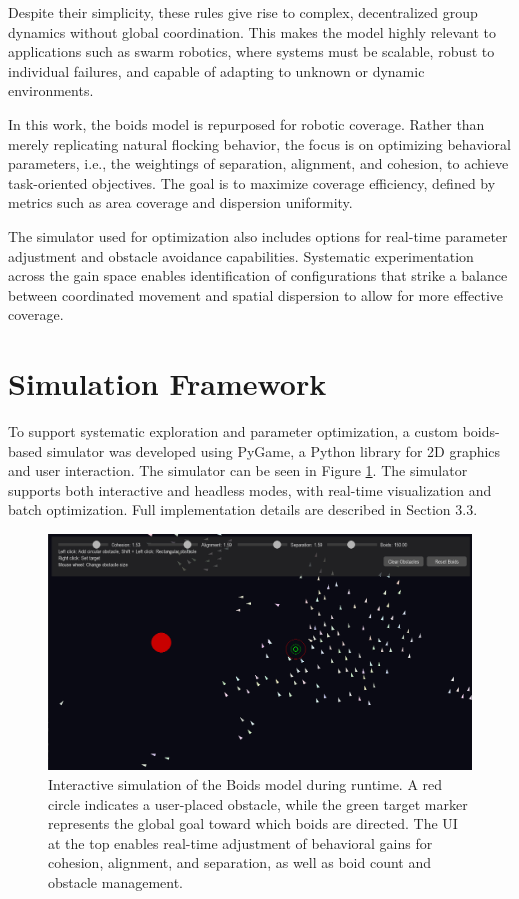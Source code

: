 \documentclass[12pt]{article}
\begin{document}
Despite their simplicity, these rules give rise to complex, decentralized group dynamics without global coordination. This makes the model highly relevant to applications such as swarm robotics, where systems must be scalable, robust to individual failures, and capable of adapting to unknown or dynamic environments.

In this work, the boids model is repurposed for robotic coverage. Rather than merely replicating natural flocking behavior, the focus is on optimizing behavioral parameters, i.e., the weightings of separation, alignment, and cohesion, to achieve task-oriented objectives. The goal is to maximize coverage efficiency, defined by metrics such as area coverage and dispersion uniformity.

The simulator used for optimization also includes options for real-time parameter adjustment and obstacle avoidance capabilities. Systematic experimentation across the gain space enables identification of configurations that strike a balance between coordinated movement and spatial dispersion to allow for more effective coverage.

\section{Simulation Framework}

To support systematic exploration and parameter optimization, a custom boids-based simulator was developed using PyGame, a Python library for 2D graphics and user interaction. The simulator can be seen in Figure \ref{fig:boids_sim}. The simulator supports both interactive and headless modes, with real-time visualization and batch optimization. Full implementation details are described in Section 3.3.

\begin{figure}[h!]
    \centering
    \includegraphics[width=0.7\linewidth]{boids_sim.png}
    \caption{Interactive simulation of the Boids model during runtime. A red circle indicates a user-placed obstacle, while the green target marker represents the global goal toward which boids are directed. The UI at the top enables real-time adjustment of behavioral gains for cohesion, alignment, and separation, as well as boid count and obstacle management.}
    \label{fig:boids_sim}
  \end{figure}
\end{document}
